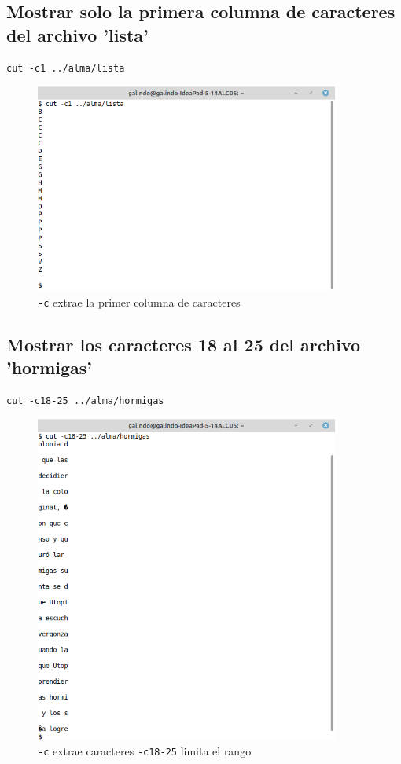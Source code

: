 \documentclass[11pt]{article}
\begin{document}
\subsection{Mostrar solo la primera columna de caracteres del archivo 'lista'}
\label{sec:org07156b8}
\begin{verbatim}
cut -c1 ../alma/lista
\end{verbatim}

\begin{figure}[htbp]
\centering
\includegraphics[width=10cm]{img/a24.png}
\caption[\texttt{-c}]{\texttt{-c} extrae la primer columna de caracteres}
\end{figure}

\pagebreak

\subsection{Mostrar los caracteres 18 al 25 del archivo 'hormigas'}
\label{sec:org2c2864a}
\begin{verbatim}
cut -c18-25 ../alma/hormigas
\end{verbatim}

\begin{figure}[htbp]
\centering
\includegraphics[width=10cm]{img/a25.png}
\caption[\texttt{-c18-25}]{\texttt{-c} extrae caracteres \texttt{-c18-25} limita el rango}
\end{figure}
\end{document}
